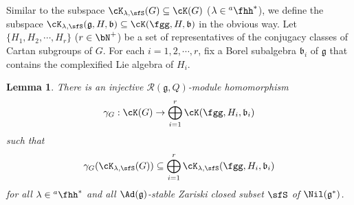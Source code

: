 \documentclass[12pt,a4paper]{amsart}
\def\subset{\subseteq}
\newcommand{\g}{\mathfrak g}
\renewcommand{\b}{\mathfrak b}
\newcommand{\be}{\begin {equation}}
\newcommand{\ee}{\end {equation}}
\numberwithin{equation}{section}
\newtheorem{lem}[thm]{Lemma}
\theoremstyle{remark}
\def\hha{{}^a\fhh}
\newcommand{\Grt}{\cK}
\begin{document}

 Similar to the subspace $\Grt_{\lambda, \sfS}(G)\subset \Grt(G)$ ($\lambda\in \hha^*$), we define the subspace $\Grt_{\lambda, \sfS}(\g,H,\b)\subset \Grt(\fgg,H,\b)$ in the obvious way.
Let $\{H_1, H_2, \cdots, H_r\}$ ($r\in \bN^+$) be  a set of representatives of the
conjugacy classes of Cartan subgroups of $G$. For each $i=1,2,\cdots, r$, fix a Borel subalgebra $\b_i$ of $\g$ that contains the complexified Lie algebra of $H_i$.

 \begin{lem}\label{cor:HC.embed}
 There is an injective $\mathcal R(\g, Q)$-module homomorphism
 \[
\gamma_{G}: \Grt(G)\rightarrow  \bigoplus_{i=1}^{r} \Grt(\fgg,H_{i},\b_{i})
 \]
 such that
 \be\label{gammag}
   \gamma_{G}(\Grt_{\lambda, \sfS}(G))\subset  \bigoplus_{i=1}^{r} \Grt_{\lambda, \sfS}(\fgg,H_{i},\b_{i})
 \ee
 for all $\lambda\in \hha^*$ and all $\Ad(\g)$-stable Zariski closed subset $\sfS$ of $\Nil(\g^*)$.

 \end{lem}
\end{document}
